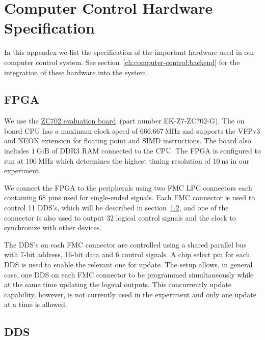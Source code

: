 
\chapter{Computer Control Hardware Specification}
\label{appendex:computer-control}

In this appendex we list the specification of the important hardware
used in our computer control system.
See section~\ref{ch:computer-control:backend} for the integration
of these hardware into the system.

\section{FPGA}
\label{appendex:computer-control:fpga}

We use the \href{https://www.xilinx.com/products/boards-and-kits/ek-z7-zc702-g.html}{ZC702 evaluation board}~(part number EK-Z7-ZC702-G).
The on board CPU has a maximum clock speed of $666.667~\mathrm{MHz}$
and supports the VFPv3 and NEON extension for floating point and SIMD instructions.
The board also includes $1~\mathrm{GiB}$ of DDR3 RAM connected to the CPU.
The FPGA is configured to run at $100~\mathrm{MHz}$ which determines
the highest timing resolution of $10~\mathrm{ns}$ in our experiment.

We connect the FPGA to the peripherals using two FMC LPC connectors
each containing 68 pins used for single-ended signals.
Each FMC connector is used to control 11 DDS's,
which will be described in section~\ref{appendex:computer-control:fpga},
and one of the connector is also used to output 32 logical control signals
and the clock to synchronize with other devices.

The DDS's on each FMC connector are controlled using a shared parallel bus
with 7-bit address, 16-bit data and 6 control signals.
A chip select pin for each DDS is used to enable the relevant one for update.
The setup allows, in general case, one DDS on each FMC connector to be programmed
simultaneously while at the same time updating the logical outputs.
This concurrently update capability, however, is not currently used in the experiment
and only one update at a time is allowed.

\section{DDS}
\label{appendex:computer-control:fpga}

